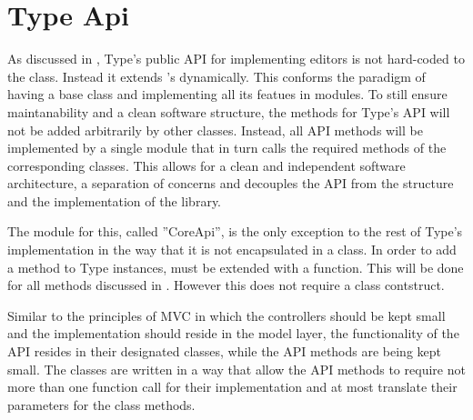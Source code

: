 



\section{Type Api}

As discussed in , Type's public API for implementing editors is not hard-coded to the  class. Instead it extends 's  dynamically. This conforms the paradigm of having a base class and implementing all its featues in modules. To still ensure maintanability and a clean software structure, the methods for Type's API will not be added arbitrarily by other classes. Instead, all API methods will be implemented by a single module that in turn calls the required methods of the corresponding classes. This allows for a clean and independent software architecture, a separation of concerns and decouples the API from the structure and the implementation of the library.

The module for this, called ''CoreApi'', is the only exception to the rest of Type's implementation in the way that it is not encapsulated in a class. In order to add a method to Type instances,  must be extended with a function. This will be done for all methods discussed in . However this does not require a class contstruct.

Similar to the principles of MVC in which the controllers should be kept small and the implementation should reside in the model layer, the functionality of the API resides in their designated classes, while the API methods are being kept small. The classes are written in a way that allow the API methods to require not more than one function call for their implementation and at most translate their parameters for the class methods.

